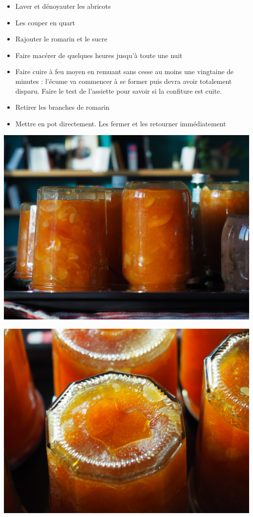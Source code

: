 \documentclass[]{book}
\providecommand{\tightlist}{%
  \setlength{\itemsep}{0pt}\setlength{\parskip}{0pt}}
\begin{document}
\begin{itemize}
\tightlist
\item
  Laver et dénoyauter les abricots
\item
  Les couper en quart
\item
  Rajouter le romarin et le sucre
\item
  Faire macérer de quelques heures jusqu'à toute une nuit
\item
  Faire cuire à feu moyen en remuant sans cesse au moins une vingtaine
  de minutes : l'écume va commencer à se former puis devra avoir
  totalement disparu. Faire le test de l'assiette pour savoir si la
  confiture est cuite.
\item
  Retirer les branches de romarin
\item
  Mettre en pot directement. Les fermer et les retourner immédiatement
\end{itemize}

\begin{center}\includegraphics[width=0.9\linewidth]{photos/conf1} \end{center}

\begin{center}\includegraphics[width=0.9\linewidth]{photos/conf2} \end{center}
\end{document}
